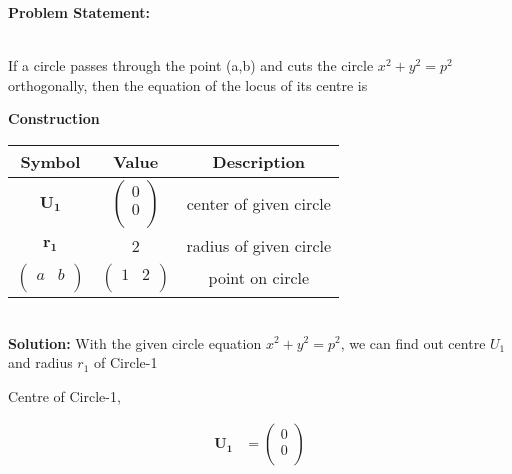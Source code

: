 \documentclass[10pt,a4paper]{report}
\let\vec\mathbf
\begin{document}
\begin{multicols}{2}


\raggedright \textbf{Problem Statement:}\vspace{2mm}
\raggedright \\If a circle passes through the point (a,b) and cuts the circle $x^2+y^2=p^2$ orthogonally, then the equation of the locus of its centre is 

\vspace{5mm}
 \vspace{2mm} 
\textbf{Construction} \\
\vspace{3mm}
{
\setlength\extrarowheight{2pt}
\begin{tabular}{|c|c|c|}
	\hline
	\textbf{Symbol}&\textbf{Value}&\textbf{Description}\\
	\hline
	$\vec{U_1}$ & $\begin{pmatrix}0 \\ 0 \\ \end{pmatrix}$ & center of given circle\\
	\hline
	$\vec{r_1}$ & 2 & radius of given circle\\ \hline
	$\begin{pmatrix}a & b \\ \end{pmatrix}$ & $\begin{pmatrix}1 & 2 \\ \end{pmatrix}$ & point on circle \\ \hline
\end{tabular}
} \\
 \vspace{2mm}
\textbf{Solution:}
\vspace{0.25cm}
With the given circle equation {$x^2+y^2=p^2$}, we can find out centre \(U_1\) and radius \(r_1\) of Circle-1 \\
\vspace{0.25cm}


Centre of Circle-1,

\begin{align} 
\vec{U_1} &= \begin{pmatrix}0 \\ 0 \\ \end{pmatrix} 
\end{align}



\end{multicols}
\end{document}
